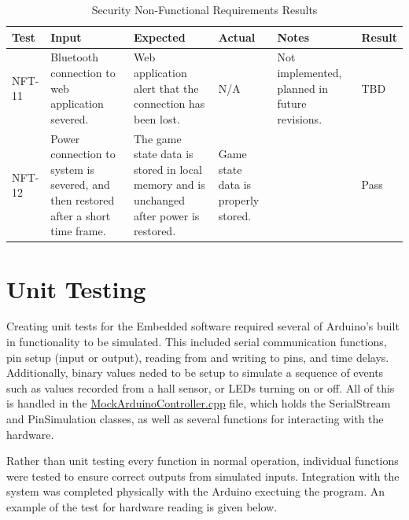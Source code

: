 \documentclass[12pt, titlepage]{article}
\begin{document}
\begin{table}[H]
\centering
    \setlength{\leftmargini}{0.4cm}
    \begin{tabular}{| >{\centering\arraybackslash}m{1cm} | 
        >{\centering\arraybackslash}m{2.5cm} | 
        >{\centering\arraybackslash}m{4cm} | 
        >{\centering\arraybackslash}m{3cm} |
        >{\centering\arraybackslash}m{3cm} |
        >{\centering\arraybackslash}m{1.5cm} |}
    \hline
    \rowcolor[gray]{0.9}
    Test & Input & Expected & Actual & Notes & Result\\
    \hline
    NFT-11 & Bluetooth connection to web application severed. & Web application alert that the connection has been lost. & N/A & Not implemented, planned in future revisions. & TBD \\
    \hline
    NFT-12 & Power connection to system is severed, and then restored after a short time frame. & The game state data is stored in local memory and is unchanged after power is restored. & Game state data is properly stored. &  & Pass \\
    \hline
    \end{tabular}
\caption{Security Non-Functional Requirements Results}
\end{table}

\section{Unit Testing} \label{UnitTest}

  Creating unit tests for the Embedded software required several of Arduino's built in functionality to be simulated. This included serial communication functions,
  pin setup (input or output), reading from and writing to pins, and time delays. Additionally, binary values neded to be setup to simulate a sequence of events 
  such as values recorded from a hall sensor, or LEDs turning on or off. All of this is handled in the 
  \href{../../test/EmbeddedTest/ArduinoTest/MockArduinoController.cpp}{MockArduinoController.cpp} file, which holds the SerialStream and PinSimulation classes,
  as well as several functions for interacting with the hardware.

  Rather than unit testing every function in normal operation, individual functions were tested to ensure correct outputs from simulated inputs. Integration 
  with the system was completed physically with the Arduino exectuing the program. An example of the test for hardware reading is given below. 
\end{document}
